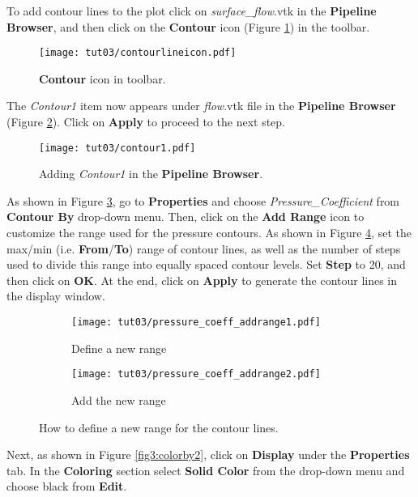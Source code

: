To add contour lines to the plot click on \textit{surface\_flow}.vtk in the \textbf{Pipeline Browser}, and then click on the \textbf{Contour} icon (Figure \ref{fig3:contour_icon}) in the toolbar.
\begin{figure}[htbp]
    \centering
    \texttt{[image: tut03/contourlineicon.pdf]}
    \caption{\textbf{Contour} icon in toolbar.}
    \label{fig3:contour_icon}
\end{figure}
The \textit{Contour1} item now appears under \textit{flow}.vtk file in the \textbf{Pipeline Browser} (Figure \ref{fig3:contour1}). Click on \textbf{Apply} to proceed to the next step.
\begin{figure}[htbp]
    \centering
    \texttt{[image: tut03/contour1.pdf]}
    \caption{Adding \textit{Contour1} in the \textbf{Pipeline Browser}.}
    \label{fig3:contour1}
\end{figure}
As shown in Figure \ref{fig3:contourby a}, go to \textbf{Properties} and choose \textit{Pressure\_Coefficient} from \textbf{Contour By} drop-down menu. Then, click on the \textbf{Add Range} icon to customize the range used for the pressure contours. As shown in Figure \ref{fig3:contourby b}, set the max/min (i.e. \textbf{From}/\textbf{To}) range of contour lines, as well as the number of steps used to divide this range into equally spaced contour levels. Set \textbf{Step} to 20, and then click on \textbf{OK}. At the end, click on \textbf{Apply} to generate the contour lines in the display window.
\begin{figure}[htbp]
    \centering
     \begin{subfigure}[b]{.4\textwidth}
         \centering
         \texttt{[image: tut03/pressure\_coeff\_addrange1.pdf]}
         \caption{Define a new range}
         \label{fig3:contourby a}
     \end{subfigure}
     \hfill
     \begin{subfigure}[b]{.4\textwidth}
         \centering
         \texttt{[image: tut03/pressure\_coeff\_addrange2.pdf]}
         \caption{Add the new range}
         \label{fig3:contourby b}
     \end{subfigure}     
    \caption{How to define a new range for the contour lines.}
    \label{fig3:contourby}
\end{figure}
Next, as shown in Figure \ref{fig3:colorby2}, click on \textbf{Display} under the \textbf{Properties} tab. In the \textbf{Coloring} section select \textbf{Solid Color} from the drop-down menu and choose black from \textbf{Edit}.

